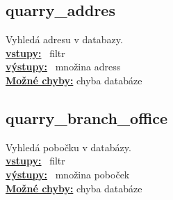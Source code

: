 \documentclass[a4paper, 11pt, twocolumn]{article}
\begin{document}
\subsection{quarry\_addres}
\vspace*{-0.3cm}
Vyhledá adresu v databazy. \\
\noindent \underline{\textbf{vstupy:}} \, filtr \\
\noindent \underline{\textbf{výstupy:}} \, množina adress   \\
\underline{\textbf{Možné chyby:}} chyba databáze \\

\subsection{quarry\_branch\_office}
\vspace*{-0.3cm}
Vyhledá pobočku v databázy. \\
\noindent \underline{\textbf{vstupy:}} \, filtr  \\
\noindent \underline{\textbf{výstupy:}} \, množina poboček\\
\underline{\textbf{Možné chyby:}} chyba databáze \\
\hfill
\end{document}
